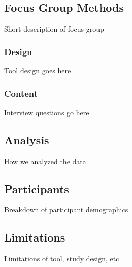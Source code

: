 \subsection{Focus Group Methods} 
Short description of focus group

\subsubsection{Design}
Tool design goes here

\subsubsection{Content}
Interview questions go here

\subsection{Analysis} 
How we analyzed the data

\subsection{Participants} 
Breakdown of participant demographics

\subsection{Limitations}
Limitations of tool, study design, etc
